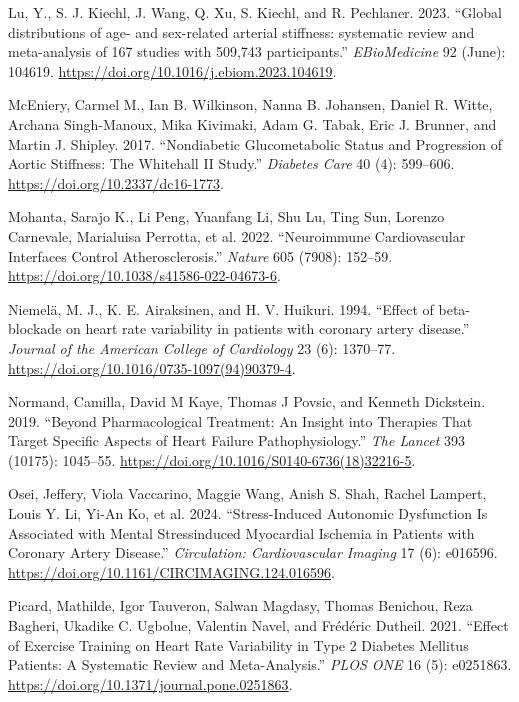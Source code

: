 \documentclass[
  a4paper,
  headsepline=true,
  open=any]{scrbook}
\newlength{\cslhangindent}
\newlength{\cslentryspacingunit} %
\newenvironment{CSLReferences}[2] %
 {%
  \setlength{\parindent}{0pt}
  \ifodd #1
  \let\oldpar\par
  \def\par{\hangindent=\cslhangindent\oldpar}
  \fi
  \setlength{\parskip}{#2\cslentryspacingunit}
 }%
 {}
\begin{document}
\begin{CSLReferences}{1}{0}
\leavevmode{}%
Lu, Y., S. J. Kiechl, J. Wang, Q. Xu, S. Kiechl, and R. Pechlaner. 2023.
{``Global distributions of age- and sex-related arterial stiffness:
systematic review and meta-analysis of 167 studies with 509,743
participants.''} \emph{EBioMedicine} 92 (June): 104619.
\url{https://doi.org/10.1016/j.ebiom.2023.104619}.

\leavevmode{}%
McEniery, Carmel M., Ian B. Wilkinson, Nanna B. Johansen, Daniel R.
Witte, Archana Singh-Manoux, Mika Kivimaki, Adam G. Tabak, Eric J.
Brunner, and Martin J. Shipley. 2017. {``Nondiabetic Glucometabolic
Status and Progression of Aortic Stiffness: The Whitehall II Study.''}
\emph{Diabetes Care} 40 (4): 599--606.
\url{https://doi.org/10.2337/dc16-1773}.

\leavevmode{}%
Mohanta, Sarajo K., Li Peng, Yuanfang Li, Shu Lu, Ting Sun, Lorenzo
Carnevale, Marialuisa Perrotta, et al. 2022. {``Neuroimmune
Cardiovascular Interfaces Control Atherosclerosis.''} \emph{Nature} 605
(7908): 152--59. \url{https://doi.org/10.1038/s41586-022-04673-6}.

\leavevmode{}%
Niemelä, M. J., K. E. Airaksinen, and H. V. Huikuri. 1994. {``Effect of
beta-blockade on heart rate variability in patients with coronary artery
disease.''} \emph{Journal of the American College of Cardiology} 23 (6):
1370--77. \url{https://doi.org/10.1016/0735-1097(94)90379-4}.

\leavevmode{}%
Normand, Camilla, David M Kaye, Thomas J Povsic, and Kenneth Dickstein.
2019. {``Beyond Pharmacological Treatment: An Insight into Therapies
That Target Specific Aspects of Heart Failure Pathophysiology.''}
\emph{The Lancet} 393 (10175): 1045--55.
\url{https://doi.org/10.1016/S0140-6736(18)32216-5}.

\leavevmode{}%
Osei, Jeffery, Viola Vaccarino, Maggie Wang, Anish S. Shah, Rachel
Lampert, Louis Y. Li, Yi-An Ko, et al. 2024. {``Stress-Induced Autonomic
Dysfunction Is Associated with Mental Stress{\textendash}induced
Myocardial Ischemia in Patients with Coronary Artery Disease.''}
\emph{Circulation: Cardiovascular Imaging} 17 (6): e016596.
\url{https://doi.org/10.1161/CIRCIMAGING.124.016596}.

\leavevmode{}%
Picard, Mathilde, Igor Tauveron, Salwan Magdasy, Thomas Benichou, Reza
Bagheri, Ukadike C. Ugbolue, Valentin Navel, and Frédéric Dutheil. 2021.
{``Effect of Exercise Training on Heart Rate Variability in Type 2
Diabetes Mellitus Patients: A Systematic Review and Meta-Analysis.''}
\emph{PLOS ONE} 16 (5): e0251863.
\url{https://doi.org/10.1371/journal.pone.0251863}.


\end{CSLReferences}
\end{document}
